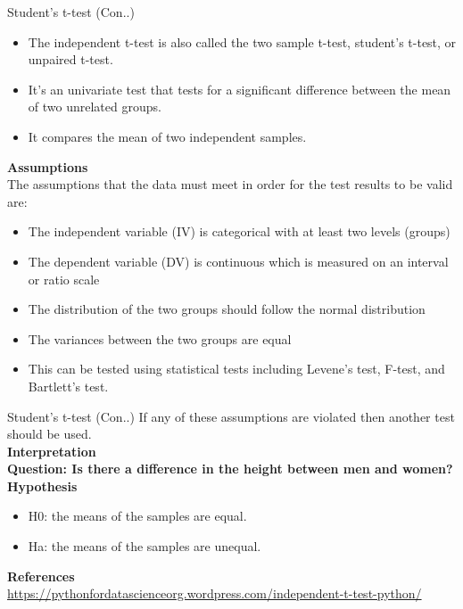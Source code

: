\begin{frame}[t]{Student's t-test (Con..)}
	\begin{itemize}
		\item The independent t-test is also called the two sample t-test, student’s t-test, or unpaired t-test.
		\item It’s an univariate test that tests for a significant difference between the mean of two unrelated groups.
		\item It compares the mean of two independent samples.
	\end{itemize}
	\textbf{Assumptions} \\
	The assumptions that the data must meet in order for the test results to be valid are: \\
		\begin{itemize}
		\item The independent variable (IV) is categorical with at least two levels (groups)
		\item The dependent variable (DV) is continuous which is measured on an interval or ratio scale
		\item The distribution of the two groups should follow the normal distribution
		\item The variances between the two groups are equal
		\item This can be tested using statistical tests including Levene’s test, F-test, and Bartlett’s test.
	\end{itemize}
\end{frame}
\begin{frame}[t]{Student's t-test (Con..)}
	If any of these assumptions are violated then another test should be used. \\
	\textbf{Interpretation}\\
	\textbf{Question: Is there a difference in the height between men and women? \\
		Hypothesis}
	\begin{itemize}
		\item H0: the means of the samples are equal.
		\item Ha: the means of the samples are unequal.
	\end{itemize}
	\textbf{References} \\
	\url{https://pythonfordatascienceorg.wordpress.com/independent-t-test-python/}
\end{frame}

